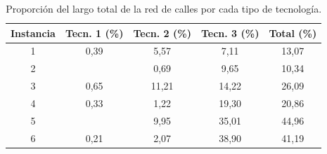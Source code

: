 \documentclass{article}
\begin{document}
  \begin{table}[h!]
    \centering
    \begin{tabular}{ccccc}
      \toprule
        Instancia & Tecn. 1 (\%) & Tecn. 2 (\%) & Tecn. 3 (\%) & Total (\%) \\
      \midrule
        1 & 0,39 & 5,57 & 7,11 & 13,07 \\
        2 &      & 0,69 & 9,65 & 10,34 \\
        3 & 0,65 & 11,21 & 14,22 & 26,09 \\
        4 & 0,33 & 1,22 & 19,30 & 20,86 \\
        5 &      & 9,95 & 35,01 & 44,96 \\
        6 & 0,21 & 2,07 & 38,90 & 41,19 \\
      \bottomrule
    \end{tabular}
    \caption{Proporción del largo total de la red de calles por cada tipo de tecnología.}
    \label{table:montevideoinfracoverage}
  \end{table}
\end{document}
